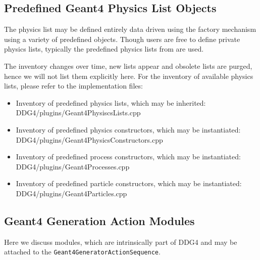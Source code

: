\subsection{Predefined Geant4 Physics List Objects}
\noindent
The physics list may be defined entirely data driven using the factory mechanism
using a variety of predefined objects. Though users are free to define private 
physics lists, typically the predefined physics lists from  are used. 

\noindent
The inventory changes over time, new lists appear and obsolete lists are purged,
hence we will not list them explicitly here.
For the inventory of available physics lists, please refer to the implementation files:

\noindent
\begin{itemize}\itemcompact
\item Inventory of predefined physics lists, which may be inherited:\\
{DDG4/plugins/Geant4PhysiscsLists.cpp}
\item Inventory of predefined physics constructors, which may be instantiated:\\
{DDG4/plugins/Geant4PhysicsConstructors.cpp}
\item Inventory of predefined process constructors, which may be instantiated:\\
{DDG4/plugins/Geant4Processes.cpp}
\item Inventory of predefined particle constructors, which may be instantiated:\\
{DDG4/plugins/Geant4Particles.cpp}
\end{itemize}
\newpage

\subsection{Geant4 Generation Action Modules}
\noindent
Here we discuss modules, which are intrinsically part of DDG4 and may be
attached to the {\tt{Geant4GeneratorActionSequence}}.

